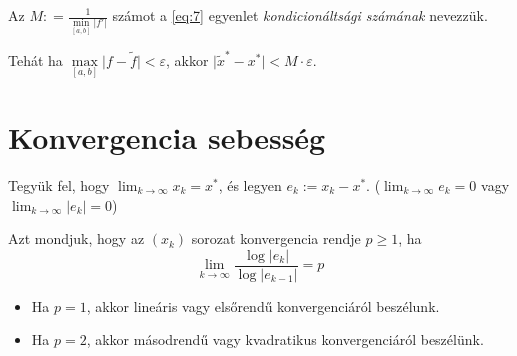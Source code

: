\begin{definition}
    Az $M : = \frac{1}{\min \limits_{[a, b]} \lvert f' \rvert  }$ számot a \ref{eq:7} egyenlet \textit{kondicionáltsági számának} nevezzük.
\end{definition}

Tehát ha $\max \limits_{[a, b]}\lvert f - \tilde{f} \rvert < \varepsilon$, akkor $\lvert  \tilde{x}^{*} - x^{*} \rvert < M \cdot \varepsilon$.


\section{Konvergencia sebesség}
Tegyük fel, hogy $\lim_{ k \to \infty }x_{k} = x^{*}$, és legyen $e_{k} := x_{k} - x^{*}$. ($\lim_{ k \to \infty } e_{k} = 0$ vagy $\lim_{ k \to \infty }\lvert e_{k} \rvert = 0$)

\begin{definition}
    Azt mondjuk, hogy az $(x_{k})$ sorozat konvergencia rendje $p \geq 1$, ha
    \begin{equation*}
        \lim_{ k \to \infty } \frac{\log \lvert e_{k} \rvert }{\log \lvert e_{k-1} \rvert } = p
    \end{equation*}
    \begin{itemize}
        \item Ha $p = 1$, akkor lineáris vagy elsőrendű konvergenciáról beszélunk. \\
        \item Ha $p = 2$, akkor másodrendű vagy kvadratikus konvergenciáról beszélünk. \\
    \end{itemize}
\end{definition}

